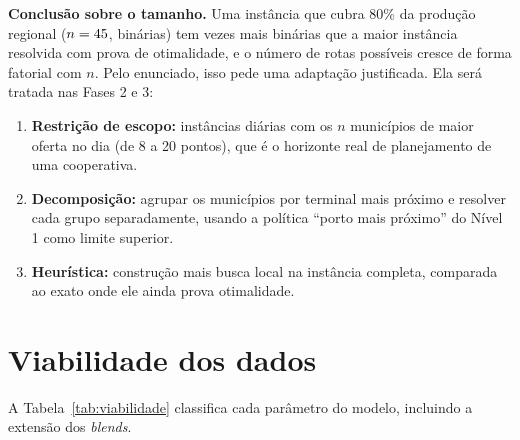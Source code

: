 \documentclass[11pt,a4paper]{article}
\begin{document}
\textbf{Conclusão sobre o tamanho.} Uma instância que cubra 80\% da produção regional ($n = 45$, \BinOitenta{}
binárias) tem \RazaoBin{} vezes mais binárias que a maior instância resolvida com prova de otimalidade, e o número
de rotas possíveis cresce de forma fatorial com $n$. Pelo
enunciado, isso pede uma adaptação justificada. Ela será tratada nas Fases 2 e 3:
\begin{enumerate}
  \item \textbf{Restrição de escopo:} instâncias diárias com os $n$ municípios de maior oferta no dia (de 8 a 20 pontos),
        que é o horizonte real de planejamento de uma cooperativa.
  \item \textbf{Decomposição:} agrupar os municípios por terminal mais próximo e resolver cada grupo separadamente,
        usando a política ``porto mais próximo'' do Nível 1 como limite superior.
  \item \textbf{Heurística:} construção mais busca local na instância completa, comparada ao exato onde ele ainda prova
        otimalidade.
\end{enumerate}

\section{Viabilidade dos dados}\label{sec:viabilidade}

A Tabela~\ref{tab:viabilidade} classifica cada parâmetro do modelo, incluindo a extensão dos \emph{blends}.
\end{document}
